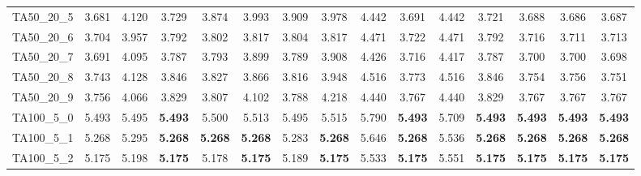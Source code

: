 \begin{tabular}{cc||ccccccccccccc}
TA50\_20\_5        & 3.681            & 4.120            & 3.729            & 3.874            & 3.993            & 3.909            & 3.978            & 4.442            & 3.691            & 4.442            & 3.721            & 3.688            & 3.686            & 3.687           \\ 
TA50\_20\_6        & 3.704            & 3.957            & 3.792            & 3.802            & 3.817            & 3.804            & 3.817            & 4.471            & 3.722            & 4.471            & 3.792            & 3.716            & 3.711            & 3.713           \\ 
TA50\_20\_7        & 3.691            & 4.095            & 3.787            & 3.793            & 3.899            & 3.789            & 3.908            & 4.426            & 3.716            & 4.417            & 3.787            & 3.700            & 3.700            & 3.698           \\ 
TA50\_20\_8        & 3.743            & 4.128            & 3.846            & 3.827            & 3.866            & 3.816            & 3.948            & 4.516            & 3.773            & 4.516            & 3.846            & 3.754            & 3.756            & 3.751           \\ 
TA50\_20\_9        & 3.756            & 4.066            & 3.829            & 3.807            & 4.102            & 3.788            & 4.218            & 4.440            & 3.767            & 4.440            & 3.829            & 3.767            & 3.767            & 3.767           \\ 
TA100\_5\_0        & 5.493            & 5.495            & {\bf 5.493}      & 5.500            & 5.513            & 5.495            & 5.515            & 5.790            & {\bf 5.493}      & 5.709            & {\bf 5.493}      & {\bf 5.493}      & {\bf 5.493}      & {\bf 5.493}     \\ 
TA100\_5\_1        & 5.268            & 5.295            & {\bf 5.268}      & {\bf 5.268}      & {\bf 5.268}      & 5.283            & {\bf 5.268}      & 5.646            & {\bf 5.268}      & 5.536            & {\bf 5.268}      & {\bf 5.268}      & {\bf 5.268}      & {\bf 5.268}     \\ 
TA100\_5\_2        & 5.175            & 5.198            & {\bf 5.175}      & 5.178            & {\bf 5.175}      & 5.189            & {\bf 5.175}      & 5.533            & {\bf 5.175}      & 5.551            & {\bf 5.175}      & {\bf 5.175}      & {\bf 5.175}      & {\bf 5.175}     \\ 

\end{tabular}
